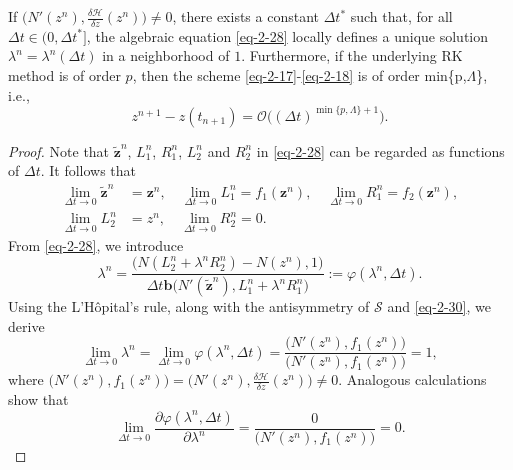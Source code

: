 \documentclass[onefignum,onetabnum]{siamart}
\begin{document}
\begin{theorem}\label{Th-2-6}
If $\big(N'(z^n),\frac{\delta\mathcal{H}}{\delta z}(z^n)\big)\neq0$, there exists a constant $\Delta t^*$ such that, for all $\Delta t\in(0,\Delta t^*]$, the algebraic equation \eqref{eq-2-28} locally defines a unique solution $\lambda^n=\lambda^n(\Delta t)$ in a neighborhood of $1$. Furthermore, if the underlying RK method is of order $p$, then the scheme \eqref{eq-2-17}-\eqref{eq-2-18} is of order \mbox{min}\{p,$\Lambda$\}, i.e.,
\begin{equation}\label{eq-2-29}
	z^{n+1}-z(t_{n+1})=\mathcal{O}\big((\Delta t)^{\min\{p,\Lambda\}+1}\big).
\end{equation}
\end{theorem}
\begin{proof}
Note that $\tilde{\textbf{z}}^n$, $L_1^n$, $R_1^n$, $L_2^n$ and $R_2^n$ in \eqref{eq-2-28} can be regarded as functions of $\Delta t$. It follows that
\begin{equation}\label{eq-2-30}
	\begin{aligned}
	\lim_{\Delta t\rightarrow 0}\tilde{\textbf{z}}^n&=\textbf{z}^n,\quad\lim_{\Delta t\rightarrow 0}L_1^n=f_1(\textbf{z}^n),\quad \lim_{\Delta t\rightarrow 0}R_1^n=f_2(\textbf{z}^n),\\
    \lim_{\Delta t\rightarrow 0}L_2^n&=z^n,\quad \lim_{\Delta t\rightarrow 0}R_2^n=0.
	\end{aligned}
\end{equation}
From \eqref{eq-2-28}, we introduce
\begin{equation}\label{eq-2-31}
	\lambda^n=\frac{\big(N(L_2^n+\lambda^nR_2^n)-N(z^n),1\big)}{\Delta t\textbf{b}\big(N'(\tilde{\textbf{z}}^n),L_1^n+\lambda^nR_1^n\big)}:=\varphi(\lambda^n,\Delta t).
\end{equation}
Using the L'H\^{o}pital's rule, along with the antisymmetry of $\mathcal{S}$ and \eqref{eq-2-30}, we derive
\begin{equation}\label{eq-2-32}
	\lim_{\Delta t\rightarrow 0}\lambda^n=\lim_{\Delta t\rightarrow 0}\varphi(\lambda^n,\Delta t)=\frac{\big(N'(z^n),f_1(z^n)\big)}{\big(N'(z^n),f_1(z^n)\big)}=1,
\end{equation}	
where $\big(N'(z^n),f_1(z^n)\big)=\big(N'(z^n),\frac{\delta\mathcal{H}}{\delta z}(z^n)\big)\neq0$. Analogous calculations show that
\begin{equation*}
	\lim_{\Delta t\rightarrow 0}\frac{\partial\varphi(\lambda^n,\Delta t)}{\partial\lambda^n}=\frac{0}{\big(N'(z^n),f_1(z^n)\big)}=0.
\end{equation*}	

\end{proof}
\end{document}
